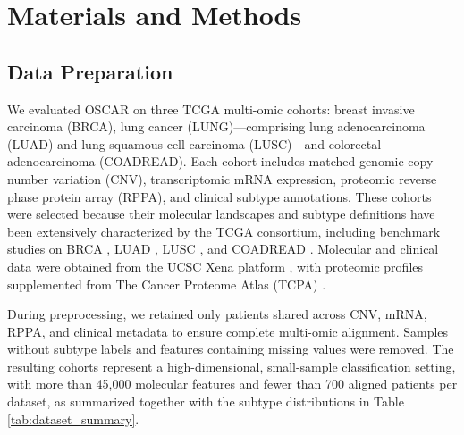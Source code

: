 \documentclass[lettersize,journal]{IEEEtran}
\begin{document}
\section{Materials and Methods}

\subsection{Data Preparation}
We evaluated OSCAR on three TCGA multi-omic cohorts: breast invasive carcinoma (BRCA), lung cancer (LUNG)---comprising lung adenocarcinoma (LUAD) and lung squamous cell carcinoma (LUSC)---and colorectal adenocarcinoma (COADREAD). Each cohort includes matched genomic copy number variation (CNV), transcriptomic mRNA expression, proteomic reverse phase protein array (RPPA), and clinical subtype annotations. These cohorts were selected because their molecular landscapes and subtype definitions have been extensively characterized by the TCGA consortium, including benchmark studies on BRCA \cite{Koboldt2012BRCA}, LUAD \cite{TCGA2014LUAD}, LUSC \cite{TCGA2012LUSC}, and COADREAD \cite{TCGA2012COADREAD}. Molecular and clinical data were obtained from the UCSC Xena platform \cite{Goldman2020Xena}, with proteomic profiles supplemented from The Cancer Proteome Atlas (TCPA) \cite{Li2013TCPA}.

During preprocessing, we retained only patients shared across CNV, mRNA, RPPA, and clinical metadata to ensure complete multi-omic alignment. Samples without subtype labels and features containing missing values were removed. The resulting cohorts represent a high-dimensional, small-sample classification setting, with more than 45,000 molecular features and fewer than 700 aligned patients per dataset, as summarized together with the subtype distributions in Table \ref{tab:dataset_summary}. 
\end{document}
